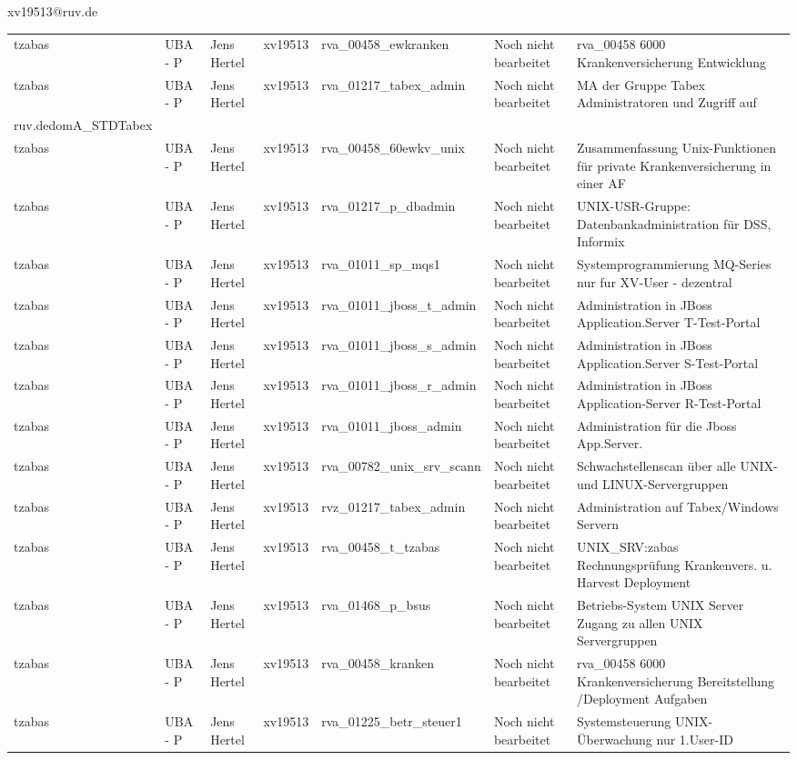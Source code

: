 \documentclass[a4paper,landscape,12pt]{letter}
\begin{document}
\begin{letter}{xv19513@ruv.de\hfill \break}
\begin{tiny}
\begin{longtable}{|p{35mm}|p{15mm}|p{25mm}|p{10mm}|p{40mm}|p{50mm}|p{50mm}|}
tzabas & UBA - P & Jens Hertel & xv19513 & rva\_00458\_ewkranken & Noch nicht bearbeitet & rva\_00458 6000 Krankenversicherung Entwicklung \\
tzabas & UBA - P & Jens Hertel & xv19513 & rva\_01217\_tabex\_admin & Noch nicht bearbeitet & MA der Gruppe Tabex Administratoren und Zugriff auf \\ruv.dedomA\_STDTabex \\
tzabas & UBA - P & Jens Hertel & xv19513 & rva\_00458\_60ewkv\_unix & Noch nicht bearbeitet & Zusammenfassung Unix-Funktionen für private Krankenversicherung in einer AF \\
tzabas & UBA - P & Jens Hertel & xv19513 & rva\_01217\_p\_dbadmin & Noch nicht bearbeitet & UNIX-USR-Gruppe: Datenbankadministration für  DSS, Informix \\
tzabas & UBA - P & Jens Hertel & xv19513 & rva\_01011\_sp\_mqs1 & Noch nicht bearbeitet & Systemprogrammierung MQ-Series nur fur XV-User - dezentral \\
tzabas & UBA - P & Jens Hertel & xv19513 & rva\_01011\_jboss\_t\_admin & Noch nicht bearbeitet & Administration in JBoss Application.Server T-Test-Portal \\
tzabas & UBA - P & Jens Hertel & xv19513 & rva\_01011\_jboss\_s\_admin & Noch nicht bearbeitet & Administration in JBoss Application.Server S-Test-Portal \\
tzabas & UBA - P & Jens Hertel & xv19513 & rva\_01011\_jboss\_r\_admin & Noch nicht bearbeitet & Administration in JBoss Application-Server R-Test-Portal \\
tzabas & UBA - P & Jens Hertel & xv19513 & rva\_01011\_jboss\_admin & Noch nicht bearbeitet & Administration für die Jboss App.Server. \\
tzabas & UBA - P & Jens Hertel & xv19513 & rva\_00782\_unix\_srv\_scann & Noch nicht bearbeitet & Schwachstellenscan über alle UNIX- und LINUX-Servergruppen \\
tzabas & UBA - P & Jens Hertel & xv19513 & rvz\_01217\_tabex\_admin & Noch nicht bearbeitet & Administration auf Tabex/Windows Servern \\
tzabas & UBA - P & Jens Hertel & xv19513 & rva\_00458\_t\_tzabas & Noch nicht bearbeitet & UNIX\_SRV:zabas Rechnungsprüfung Krankenvers. u. Harvest Deployment \\
tzabas & UBA - P & Jens Hertel & xv19513 & rva\_01468\_p\_bsus & Noch nicht bearbeitet & Betriebs-System UNIX Server Zugang zu allen UNIX Servergruppen \\
tzabas & UBA - P & Jens Hertel & xv19513 & rva\_00458\_kranken & Noch nicht bearbeitet & rva\_00458 6000 Krankenversicherung Bereitstellung /Deployment Aufgaben \\
tzabas & UBA - P & Jens Hertel & xv19513 & rva\_01225\_betr\_steuer1 & Noch nicht bearbeitet & Systemsteuerung UNIX-Überwachung nur 1.User-ID \\


\end{longtable}
\end{tiny}
\end{letter}
\end{document}
